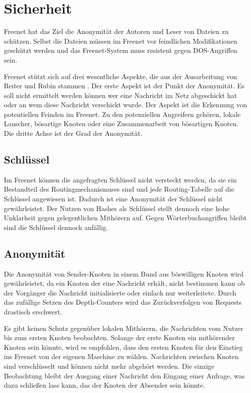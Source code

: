 \section{Sicherheit}
Freenet hat das Ziel die Anonymität der Autoren und Leser von Dateien zu
schützen. Selbst die Dateien müssen im Freenet vor feindlichen Modifikationen
geschützt werden und das Freenet-System muss resistent gegen DOS-Angriffen
sein.

Freenet stützt sich auf drei wesentliche Aspekte, die aus der Ausarbeitung
von Reiter und Rubin stammen \cite{reiterandrubin}. Der erste Aspekt ist der
Punkt der Anonymität. Es soll nicht ermittelt werden können wer eine Nachricht
im Netz abgeschickt hat oder an wem diese Nachricht verschickt wurde.
Der Aspekt ist die Erkennung von potentiellen Feinden im Freenet. Zu den
potenziellen Angreifern gehören, lokale Lauscher, bösartige Knoten oder eine
Zusammenarbeit von bösartigen Knoten. Die dritte Achse ist der Grad der
Anonymität.

\subsection{Schlüssel}
Im Freenet können die angefragten Schlüssel nicht versteckt werden, da
sie ein Bestandteil des Routingmechanismuses sind und jede Routing-Tabelle auf
die Schlüssel angewiesen ist. Dadurch ist eine Anonymität der Schlüssel nicht
gewährleistet. Der Nutzen von Hashes als Schlüssel stellt dennoch eine hohe
Unklarheit gegen gelegentlichen Mithörern auf.
Gegen Wörterbuchangriffen bleibt sind die Schlüssel dennoch anfällig.

\subsection{Anonymität}
Die Anonymität von Sender-Knoten in einem Bund aus böswilligen Knoten wird
gewährleistet, da ein Knoten der eine Nachricht erhält, nicht bestimmen kann
ob der Vorgänger die Nachricht initialisierte oder einfach nur
weiterleitete. Durch das zufällige Setzen des Depth-Counters wird das
Zurückverfolgen von Requests drastisch erschwert.

Es gibt keinen Schutz gegenüber lokalen Mithörern, die Nachrichten vom Nutzer
bis zum ersten Knoten beobachten. Solange der erste Knoten ein mithörender
Knoten sein könnte, wird es empfohlen, dass den ersten Knoten für
den Einstieg ins Freenet von der eigenen Maschine zu wählen. Nachrichten
zwischen Knoten sind verschlüsselt und können nicht mehr abgehört werden. Die
einzige Beobachtung bleibt der Ausgang einer Nachricht den Eingang einer
Anfrage, was dazu schließen lass kann, das der Knoten der Absender sein könnte.

